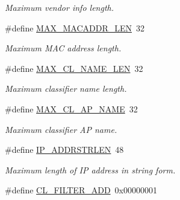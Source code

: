 \begin{DoxyCompactItemize}
\begin{DoxyCompactList}\small\item\em Maximum vendor info length. \end{DoxyCompactList}\item 
\hypertarget{group__FAPI__QOS__CLASS_gaaee7f1d8ba9da4f019bf0068103e6672}{\#define \hyperlink{group__FAPI__QOS__CLASS_gaaee7f1d8ba9da4f019bf0068103e6672}{M\-A\-X\-\_\-\-M\-A\-C\-A\-D\-D\-R\-\_\-\-L\-E\-N}~32}\label{group__FAPI__QOS__CLASS_gaaee7f1d8ba9da4f019bf0068103e6672}

\begin{DoxyCompactList}\small\item\em Maximum M\-A\-C address length. \end{DoxyCompactList}\item 
\hypertarget{group__FAPI__QOS__CLASS_ga34277a18827d255a596f886d8a9f201b}{\#define \hyperlink{group__FAPI__QOS__CLASS_ga34277a18827d255a596f886d8a9f201b}{M\-A\-X\-\_\-\-C\-L\-\_\-\-N\-A\-M\-E\-\_\-\-L\-E\-N}~32}\label{group__FAPI__QOS__CLASS_ga34277a18827d255a596f886d8a9f201b}

\begin{DoxyCompactList}\small\item\em Maximum classifier name length. \end{DoxyCompactList}\item 
\hypertarget{group__FAPI__QOS__CLASS_ga078fa167f6c71720c8ca3158564002ae}{\#define \hyperlink{group__FAPI__QOS__CLASS_ga078fa167f6c71720c8ca3158564002ae}{M\-A\-X\-\_\-\-C\-L\-\_\-\-A\-P\-\_\-\-N\-A\-M\-E}~32}\label{group__FAPI__QOS__CLASS_ga078fa167f6c71720c8ca3158564002ae}

\begin{DoxyCompactList}\small\item\em Maximum classifier A\-P name. \end{DoxyCompactList}\item 
\hypertarget{group__FAPI__QOS__CLASS_ga684323e1ca3c7464366255d8ab239c18}{\#define \hyperlink{group__FAPI__QOS__CLASS_ga684323e1ca3c7464366255d8ab239c18}{I\-P\-\_\-\-A\-D\-D\-R\-S\-T\-R\-L\-E\-N}~48}\label{group__FAPI__QOS__CLASS_ga684323e1ca3c7464366255d8ab239c18}

\begin{DoxyCompactList}\small\item\em Maximum length of I\-P address in string form. \end{DoxyCompactList}\item 
\hypertarget{group__FAPI__QOS__CLASS_gaac7b0ddf6094639bb919ac794ac2d330}{\#define \hyperlink{group__FAPI__QOS__CLASS_gaac7b0ddf6094639bb919ac794ac2d330}{C\-L\-\_\-\-F\-I\-L\-T\-E\-R\-\_\-\-A\-D\-D}~0x00000001}\label{group__FAPI__QOS__CLASS_gaac7b0ddf6094639bb919ac794ac2d330}


\end{DoxyCompactItemize}
